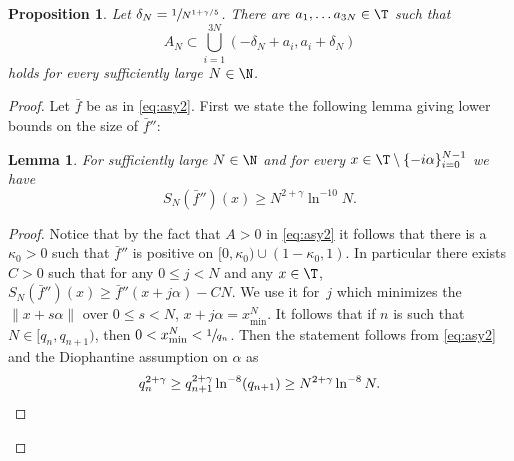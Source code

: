 \documentclass[JEP,XML,SOM,Unicode,NoFloatCountersInSection]{cedram}
\theoremstyle{definition}
\theoremstyle{plain}
\newtheorem{lemma}[definition]{Lemma}
\newtheorem{proposition}[definition]{Proposition}
\begin{document}
\begin{proposition} \label{lemma.delta}
Let $\delta_N=\sfrac{1}{N^{1+\gamma/5}}$. There are $a_1,\ldots a_{3N}\in \T$ such that
\begin{equation}\label{eq:an}
A_N\subset \bigcup_{i=1}^{3N}(-\delta_N+a_i,a_i+\delta_N)
\end{equation}
holds for every sufficiently large $N\in \N$.
\end{proposition}
\begin{proof}
Let $\bar{f}$ be as in \eqref{eq:asy2}. First we state the following lemma giving lower bounds on the size of $\bar{f}{}''$:
\begin{lemma}\label{lem:DK} For sufficiently large $N\in \N$ and for every $x\in \T\setminus\{-i\alpha\}_{i=0}^{N-1}$ we have
\[
S_N(\bar{f}{}'')(x)\geq N^{2+\gamma}\ln^{-10}N.
\]
\end{lemma}
\begin{proof} { Notice that by the fact that $A>0$ in \eqref{eq:asy2} it follows that there is a $\kappa_0>0$ such that $\bar{f}{}''$ is positive on $[0,\kappa_0)\cup (1-\kappa_0,1)$. In particular there exists $C>0$ such that for any $0\leq j<N$ and any $x\in \T$, $S_N(\bar{f}{}'')(x)\geq \bar{f}{}''(x+j\alpha)- C N$. We use it for~$j$ which minimizes the $\|x+s\alpha\|$ over $0\leq s<N$, \ie $x+j\alpha=x^N_{\min}$}. It follows that if $n$ is such that $N\in [q_n,q_{n+1})$, then $0<x^N_{\min}<\sfrac{1}{q_n}$. Then the statement follows from \eqref{eq:asy2} and the Diophantine assumption on $\alpha$ as
\[
q_n^{2+\gamma}\geq q_{n+1}^{2+\gamma}\ln^{-8}(q_{n+1})\geq N^{2+\gamma}\ln^{-8}N.\qedhere
\]
\end{proof}


\end{proof}
\end{document}
